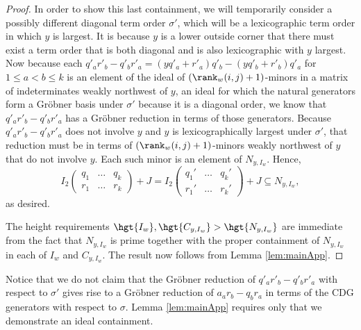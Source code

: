 \begin{proof}
In order to show this last containment, we will temporarily consider a possibly different diagonal term order $\sigma'$, which will be a lexicographic term order in which $y$ is largest.  It is because $y$ is a lower outside corner that there must exist a term order that is both diagonal and is also lexicographic with $y$ largest.  Now because each $q'_ar'_b-q'_br'_a = (yq'_a+r'_a)q'_b-(yq'_b+r'_b)q'_a$ for $1 \leq a<b \leq k$ is an element of the ideal of  $(\rank_w(i,j)+1)$-minors in a matrix of indeterminates weakly northwest of $y$, an ideal for which the natural generators form a Gr\"obner basis under $\sigma'$ because it is a diagonal order, we know that $q'_ar'_b-q'_br'_a$ has a Gr\"obner reduction in terms of those generators.  Because $q'_ar'_b-q'_br'_a$ does not involve $y$ and $y$ is lexicographically largest under $\sigma'$, that reduction must be in terms of $(\rank_w(i,j)+1)$-minors weakly northwest of $y$ that do not involve $y$.  Each such minor is an element of $N_{y,I_w}$.  Hence, \[
I_2 \begin{pmatrix} q_1 & \ldots & q_k \\ r_1 & \ldots & r_k \end{pmatrix}+J = I_2 \begin{pmatrix} q_1' & \ldots & q_k' \\ r_1' & \ldots & r_k' \end{pmatrix}+J \subseteq N_{y,I_w},
\] as desired. 

The height requirements $\hgt{I_w}, \hgt{C_{y,I_w}} > \hgt{N_{y,I_w}}$ are immediate from the fact that $N_{y,I_w}$ is prime \cite[Proposition 3.3]{Ful92} together with the proper containment of $N_{y,I_w}$ in each of $I_w$ and $C_{y,I_w}$.  The result now follows from Lemma \ref{lem:mainApp}.
\end{proof}

Notice that we do not claim that the Gr\"obner reduction of $q'_ar'_b-q'_br'_a$ with respect to $\sigma'$ gives rise to a Gr\"obner reduction of $a_ar_b-q_br_a$ in terms of the CDG generators with respect to $\sigma$.  Lemma \ref{lem:mainApp} requires only that we demonstrate an ideal containment.
